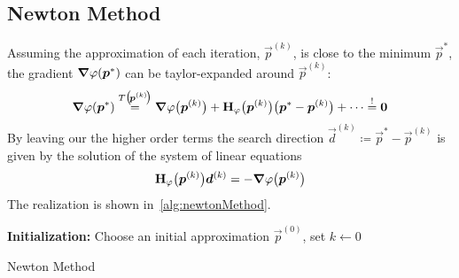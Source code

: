 		\subsection{Newton Method}
			Assuming the approximation of each iteration, \( \vec{p}^{(k)} \), is close to the minimum \( \vec{p}^\ast \), the gradient \( \grad{\varphi}(\bm{p}^\ast) \) can be taylor-expanded around \( \vec{p}^{(k)} \):
			\begin{align*}
				\grad{\varphi}(\bm{p}^\ast) \overset{T\big(\!\bm{p}^{(k)}\!\big)}{=} \grad{\varphi}\big(\bm{p}^{(k)}\big) + \bm{\mathrm{H}}_\varphi\big(\bm{p}^{(k)}\big) \big( \bm{p}^\ast - \bm{p}^{(k)} \big) + \cdots \overset{!}{=} \bm{0}
			\end{align*}
			By leaving our the higher order terms the search direction \( \vec{d}^{(k)} \coloneqq \vec{p}^\ast - \vec{p}^{(k)} \) is given by the solution of the system of linear equations
			\begin{align*}
				\bm{\mathrm{H}}_\varphi\big(\bm{p}^{(k)}\big) \bm{d}^{(k)} = -\grad{\varphi}\big(\bm{p}^{(k)}\big)
			\end{align*}
			The realization is shown in~\autoref{alg:newtonMethod}.

			\begin{algorithm}  \DontPrintSemicolon
				\textbf{Initialization:} Choose an initial approximation \(\vec{p}^{(0)}\), set \( k \gets 0 \) \;

				\caption{Newton Method}
				\label{alg:newtonMethod}
			\end{algorithm}

